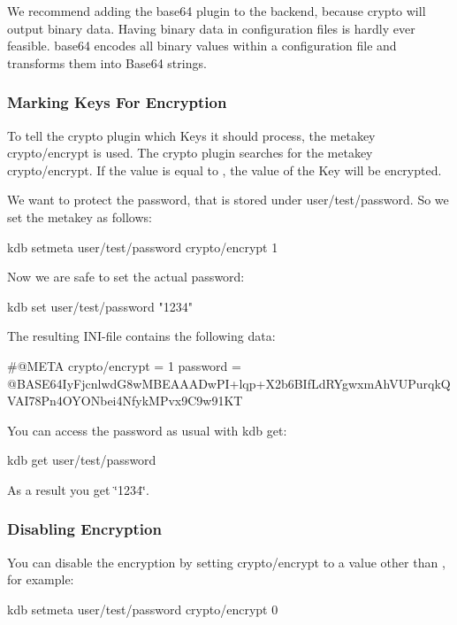We recommend adding the {\ttfamily base64} plugin to the backend, because {\ttfamily crypto} will output binary data. Having binary data in configuration files is hardly ever feasible. {\ttfamily base64} encodes all binary values within a configuration file and transforms them into Base64 strings.

\subsubsection*{Marking Keys For Encryption}

To tell the {\ttfamily crypto} plugin which Keys it should process, the metakey {\ttfamily crypto/encrypt} is used. The {\ttfamily crypto} plugin searches for the metakey {\ttfamily crypto/encrypt}. If the value is equal to {}, the value of the Key will be encrypted.

We want to protect the password, that is stored under {\ttfamily user/test/password}. So we set the metakey as follows\+: \begin{DoxyVerb}kdb setmeta user/test/password crypto/encrypt 1
\end{DoxyVerb}


Now we are safe to set the actual password\+: \begin{DoxyVerb}kdb set user/test/password "1234"
\end{DoxyVerb}


The resulting I\+N\+I-\/file contains the following data\+: \begin{DoxyVerb}#@META crypto/encrypt = 1
password = @BASE64IyFjcnlwdG8wMBEAAADwPI+lqp+X2b6BIfLdRYgwxmAhVUPurqkQVAI78Pn4OYONbei4NfykMPvx9C9w91KT
\end{DoxyVerb}


You can access the password as usual with {\ttfamily kdb get}\+: \begin{DoxyVerb}kdb get user/test/password
\end{DoxyVerb}


As a result you get \char`\"{}1234\char`\"{}.

\subsubsection*{Disabling Encryption}

You can disable the encryption by setting {\ttfamily crypto/encrypt} to a value other than {}, for example\+: \begin{DoxyVerb}kdb setmeta user/test/password crypto/encrypt 0
\end{DoxyVerb}


